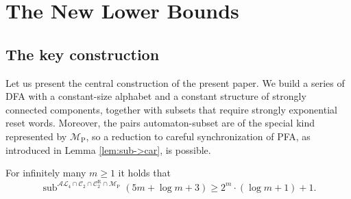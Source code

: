 \documentclass{ws-ijmpc}
\DeclareMathOperator{\sub}{sub}
\begin{document}
\section{The New Lower Bounds\label{sec:The-New-Lower Bounds}}


\subsection{The key construction}

Let us present the central construction of the present paper. We build
a series of DFA with a constant-size alphabet and a constant structure
of strongly connected components, together with subsets that require
strongly exponential reset words. Moreover, the pairs automaton-subset
are of the special kind represented by $\mathcal{M}_{\mathrm{P}}$,
so a reduction to careful synchronization of PFA, as introduced in
Lemma \ref{lem:sub->car}, is possible.
\begin{lemma}
\label{lem: de bruijn automaton}For infinitely many $m\ge1$ it holds
that
\[
\sub^{\mathcal{AL}_{4}\cap\mathcal{C}_{2}\cap\mathcal{C}_{2}^{\mathrm{R}}\cap\mathcal{M}_{\mathrm{P}}}\!\left(5m+\log m+3\right)\ge2^{m}\cdot\left(\log m+1\right)+1.
\]
\end{lemma}
\end{document}
